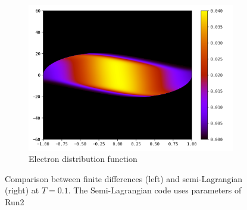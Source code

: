 \documentclass{article}
\numberwithin{equation}{section}
\newcommand{\imh}{\textheight} %
\newcommand{\imw}{\textwidth} %
\begin{document}
\begin{figure}
\begin{subfigure}{\textwidth}
		\includegraphics[height=\imh,width=\imw]{images/feT0p1.png}
		\caption{Electron distribution function}
		\label{subfig:compT01_electron}
	\end{subfigure}
	\caption{Comparison between finite differences (left) and semi-Lagrangian (right) at $T=0.1$. The Semi-Lagrangian code uses parameters of Run2}
	\label{fig:compT01}
\end{figure}  
\end{document}
